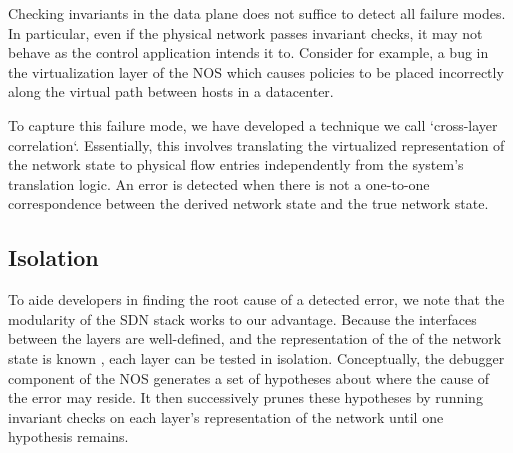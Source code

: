 Checking invariants in the data plane does not suffice to detect all failure modes. In
particular, even if the physical network passes invariant checks, it may not behave as
the control application intends it to. Consider for example, a bug in the
virtualization layer of the NOS which causes policies to be placed
incorrectly along the virtual path between hosts in a datacenter.

To capture this failure mode, we have developed a technique we call `cross-layer
correlation`. Essentially, this involves translating the
virtualized representation of the network state to physical flow entries
independently from the system's translation logic. An error is detected when
there is not a one-to-one correspondence between the derived network
state and the true network state.


\subsection{Isolation}
\label{sec:isolation}

To aide developers in finding the root cause of a detected error, we note that
the modularity of the SDN stack works to our advantage. Because the interfaces
between the layers are well-defined, and the representation of the 
of the network state is known \apriori, each layer can be tested in
isolation. Conceptually, the debugger component of the NOS generates a set of hypotheses about
where the cause of the error may reside. It then successively prunes these
hypotheses by running invariant checks on each layer's representation of the
network until one hypothesis remains.

